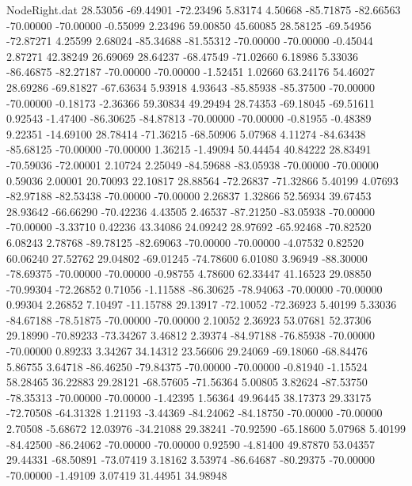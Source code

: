\begin{filecontents}{NodeRight.dat}
  28.53056  -69.44901  -72.23496     5.83174    4.50668  -85.71875  -82.66563  -70.00000  -70.00000   -0.55099    2.23496   59.00850   45.60085
  28.58125  -69.54956  -72.87271     4.25599    2.68024  -85.34688  -81.55312  -70.00000  -70.00000   -0.45044    2.87271   42.38249   26.69069
  28.64237  -68.47549  -71.02660     6.18986    5.33036  -86.46875  -82.27187  -70.00000  -70.00000   -1.52451    1.02660   63.24176   54.46027
  28.69286  -69.81827  -67.63634     5.93918    4.93643  -85.85938  -85.37500  -70.00000  -70.00000   -0.18173   -2.36366   59.30834   49.29494
  28.74353  -69.18045  -69.51611     0.92543   -1.47400  -86.30625  -84.87813  -70.00000  -70.00000   -0.81955   -0.48389    9.22351  -14.69100
  28.78414  -71.36215  -68.50906     5.07968    4.11274  -84.63438  -85.68125  -70.00000  -70.00000    1.36215   -1.49094   50.44454   40.84222
  28.83491  -70.59036  -72.00001     2.10724    2.25049  -84.59688  -83.05938  -70.00000  -70.00000    0.59036    2.00001   20.70093   22.10817
  28.88564  -72.26837  -71.32866     5.40199    4.07693  -82.97188  -82.53438  -70.00000  -70.00000    2.26837    1.32866   52.56934   39.67453
  28.93642  -66.66290  -70.42236     4.43505    2.46537  -87.21250  -83.05938  -70.00000  -70.00000   -3.33710    0.42236   43.34086   24.09242
  28.97692  -65.92468  -70.82520     6.08243    2.78768  -89.78125  -82.69063  -70.00000  -70.00000   -4.07532    0.82520   60.06240   27.52762
  29.04802  -69.01245  -74.78600     6.01080    3.96949  -88.30000  -78.69375  -70.00000  -70.00000   -0.98755    4.78600   62.33447   41.16523
  29.08850  -70.99304  -72.26852     0.71056   -1.11588  -86.30625  -78.94063  -70.00000  -70.00000    0.99304    2.26852    7.10497  -11.15788
  29.13917  -72.10052  -72.36923     5.40199    5.33036  -84.67188  -78.51875  -70.00000  -70.00000    2.10052    2.36923   53.07681   52.37306
  29.18990  -70.89233  -73.34267     3.46812    2.39374  -84.97188  -76.85938  -70.00000  -70.00000    0.89233    3.34267   34.14312   23.56606
  29.24069  -69.18060  -68.84476     5.86755    3.64718  -86.46250  -79.84375  -70.00000  -70.00000   -0.81940   -1.15524   58.28465   36.22883
  29.28121  -68.57605  -71.56364     5.00805    3.82624  -87.53750  -78.35313  -70.00000  -70.00000   -1.42395    1.56364   49.96445   38.17373
  29.33175  -72.70508  -64.31328     1.21193   -3.44369  -84.24062  -84.18750  -70.00000  -70.00000    2.70508   -5.68672   12.03976  -34.21088
  29.38241  -70.92590  -65.18600     5.07968    5.40199  -84.42500  -86.24062  -70.00000  -70.00000    0.92590   -4.81400   49.87870   53.04357
  29.44331  -68.50891  -73.07419     3.18162    3.53974  -86.64687  -80.29375  -70.00000  -70.00000   -1.49109    3.07419   31.44951   34.98948

\end{filecontents}
